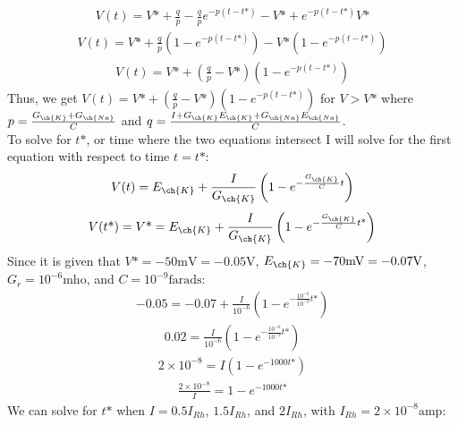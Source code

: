 \documentclass[11pt]{article}
\begin{document}
\begin{enumerate}[label=\arabic*.]
\begin{enumerate}[label=(\alph*)]
\begin{align*}
\end{align*}
\begin{align*}
V(t) = V\text{*} + \frac{q} {p} - \frac{q} {p} e^{-p\left(t - t\text{*}\right)} - V\text{*} + e^{-p\left(t - t\text{*}\right)} V\text{*}
\end{align*}
\begin{align*}
V(t) = V\text{*} + \frac{q} {p} \left(1 - e^{-p\left(t - t\text{*}\right)}\right) - V\text{*} \left(1 - e^{-p\left(t - t\text{*}\right)}\right)
\end{align*}
\begin{align*}
V(t) = V\text{*} + \left(\frac{q} {p} - V\text{*}\right) \left(1 - e^{-p\left(t - t\text{*}\right)}\right)
\end{align*}
Thus, we get $V(t) = V\text{*} + \left(\frac{q} {p} - V\text{*}\right) \left(1 - e^{-p\left(t - t\text{*}\right)}\right)$ for $V > V\text{*}$ where $p = \frac{G_{\ch{K}} + G_{\ch{Na}}} {C}$ and $q = \frac{I + G_{\ch{K}} E_{\ch{K}} + G_{\ch{Na}} E_{\ch{Na}}} {C}$.
\vspace*{1\baselineskip}
\\
To solve for $t\text{*}$, or time where the two equations intersect I will solve for the first equation with respect to time $t = t\text{*}$:
\begin{align*}
V(t) = E_{\ch{K}} + \frac{I} {G_{\ch{K}}} \left(1 - e^{-\frac{G_{\ch{K}}} {C} t}\right)
\end{align*}
\begin{align*}
V(t\text{*}) = V\text{*} = E_{\ch{K}} + \frac{I} {G_{\ch{K}}} \left(1 - e^{-\frac{G_{\ch{K}}} {C} t\text{*}}\right)
\end{align*}
Since it is given that $V\text{*} = -50 \text{mV} = -0.05 \text{V}$, $E_{\ch{K}} = -70 \text{mV} = -0.07 \text{V}$, $G_r = 10^{-6} \text{mho}$, and $C = 10^{-9} \text{farads}$:
\begin{align*}
-0.05 = -0.07 + \frac{I} {10^{-6}} \left(1 - e^{-\frac{10^{-6}} {10^{-9}} t\text{*}}\right)
\end{align*}
\begin{align*}
0.02 = \frac{I} {10^{-6}} \left(1 - e^{-\frac{10^{-6}} {10^{-9}} t\text{*}}\right)
\end{align*}
\begin{align*}
2 \times 10^{-8} = I \left(1 - e^{-1000 t\text{*}}\right)
\end{align*}
\begin{align*}
\frac{2 \times 10^{-8}} {I} = 1 - e^{-1000 t\text{*}}
\end{align*}
We can solve for $t\text{*}$ when $I = 0.5 I_{Rh}$, $1.5 I_{Rh}$, and $2 I_{Rh}$, with $I_{Rh} = 2 \times 10^{-8} \text{amp}$:

\end{enumerate}
\end{enumerate}
\end{document}
